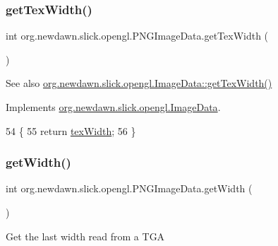 \subsubsection{\texorpdfstring{get\+Tex\+Width()}{getTexWidth()}}
{\footnotesize\ttfamily int org.\+newdawn.\+slick.\+opengl.\+P\+N\+G\+Image\+Data.\+get\+Tex\+Width (\begin{DoxyParamCaption}{ }\end{DoxyParamCaption})\hspace{0.3cm}{\ttfamily [inline]}}

\begin{DoxySeeAlso}{See also}
\mbox{\hyperlink{interfaceorg_1_1newdawn_1_1slick_1_1opengl_1_1_image_data_abf26e8dcbf2ec52f9a49535d8912263e}{org.\+newdawn.\+slick.\+opengl.\+Image\+Data\+::get\+Tex\+Width()}} 
\end{DoxySeeAlso}


Implements \mbox{\hyperlink{interfaceorg_1_1newdawn_1_1slick_1_1opengl_1_1_image_data_abf26e8dcbf2ec52f9a49535d8912263e}{org.\+newdawn.\+slick.\+opengl.\+Image\+Data}}.


\begin{DoxyCode}
54                              \{
55         \textcolor{keywordflow}{return} \mbox{\hyperlink{classorg_1_1newdawn_1_1slick_1_1opengl_1_1_p_n_g_image_data_a2175af9c4d26dbfce0d4fe0546cb92df}{texWidth}};
56     \}
\end{DoxyCode}
\mbox{\label{classorg_1_1newdawn_1_1slick_1_1opengl_1_1_p_n_g_image_data_a6f5520a374bf2ab19d08116c27017833}} 
\subsubsection{\texorpdfstring{get\+Width()}{getWidth()}}
{\footnotesize\ttfamily int org.\+newdawn.\+slick.\+opengl.\+P\+N\+G\+Image\+Data.\+get\+Width (\begin{DoxyParamCaption}{ }\end{DoxyParamCaption})\hspace{0.3cm}{\ttfamily [inline]}}

Get the last width read from a T\+GA

